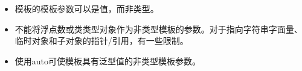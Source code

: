 
\begin{itemize}
\item 
模板的模板参数可以是值，而非类型。

\item 
不能将浮点数或类类型对象作为非类型模板的参数。对于指向字符串字面量、临时对象和子对象的指针/引用，有一些限制。

\item 
使用auto可使模板具有泛型值的非类型模板参数。
\end{itemize}